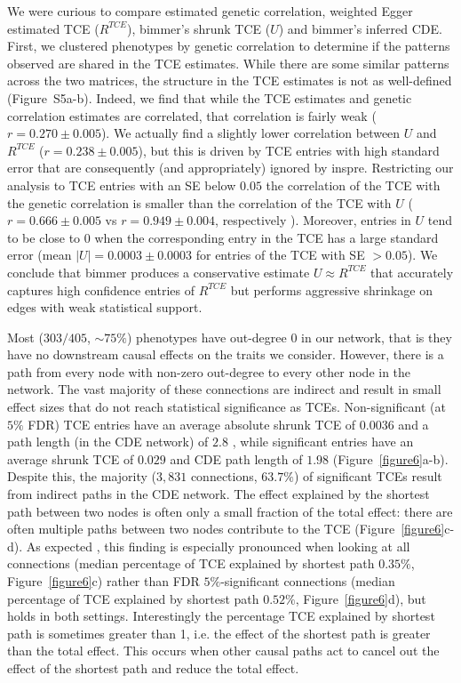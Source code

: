 \documentclass{article}
\begin{document}
We were curious to compare estimated
genetic correlation, weighted Egger estimated TCE ($R^{TCE}$), bimmer's
shrunk TCE ($U$) and bimmer's inferred CDE. First, we clustered phenotypes by genetic correlation
to determine if the patterns observed are shared in the TCE estimates.
While there are some similar patterns across the two matrices, the structure in the TCE estimates
is not as well-defined (Figure~S5a-b).
Indeed, we find that while the TCE estimates
and genetic correlation estimates are correlated, that correlation is fairly
weak ($r = 0.270\pm 0.005$). We actually find a slightly lower correlation between
 $U$ and $R^{TCE}$ ($r = 0.238 \pm 0.005$), but this is driven by TCE entries with high standard error that are consequently
(and appropriately) ignored by inspre. Restricting our analysis to TCE entries with an
SE below $0.05$ the correlation of the TCE with the genetic correlation is smaller
than the correlation of the TCE with $U$ ($r = 0.666 \pm 0.005$ vs $r = 0.949 \pm 0.004$, respectively ).
Moreover, entries in $U$ tend to be close to $0$ when the corresponding
entry in the TCE has a large standard error (mean ${|U|} = 0.0003 \pm 0.0003$ for entries of
the TCE with SE $> 0.05$). We conclude that bimmer produces a conservative
estimate $U \approx R^{TCE}$ that accurately captures high confidence entries of $R^{TCE}$ but performs aggressive shrinkage on edges with weak statistical support. 

Most ($303/405$, $\sim 75\%$) phenotypes have out-degree $0$ in our network, that is they have no
downstream causal effects on the traits we consider. However, there is a path from every node with non-zero
out-degree to every other node in the network. The vast majority  of these connections
are indirect and result in small effect sizes that do not reach
statistical significance as TCEs. Non-significant (at $5\%$ FDR) TCE entries have an average absolute shrunk TCE of $0.0036$ and a path length (in the CDE network) of $2.8$ , while
significant entries have an average shrunk TCE of $0.029$ and CDE path length of $1.98$
(Figure~\ref{figure6}a-b). Despite this, the majority ($3,831$ connections, $63.7\%$) of significant TCEs result from indirect paths in the CDE network.
The effect explained by the shortest path between two nodes is often only a small
fraction of the total effect: there are often  multiple paths between two nodes contribute to the TCE (Figure~\ref{figure6}c-d). As expected , this finding is especially pronounced 
when looking at all connections (median percentage of TCE explained
by shortest path $0.35\%$, Figure~\ref{figure6}c) rather than FDR $5\%$-significant connections
(median percentage of TCE explained
by shortest path $0.52\%$, Figure~\ref{figure6}d), but holds in both settings.
Interestingly the percentage TCE explained
by shortest path is sometimes greater than 1, i.e. the
effect of the shortest path is greater than the total effect. This occurs when other causal paths act to cancel out the effect of the shortest path and reduce the total effect.
\end{document}
